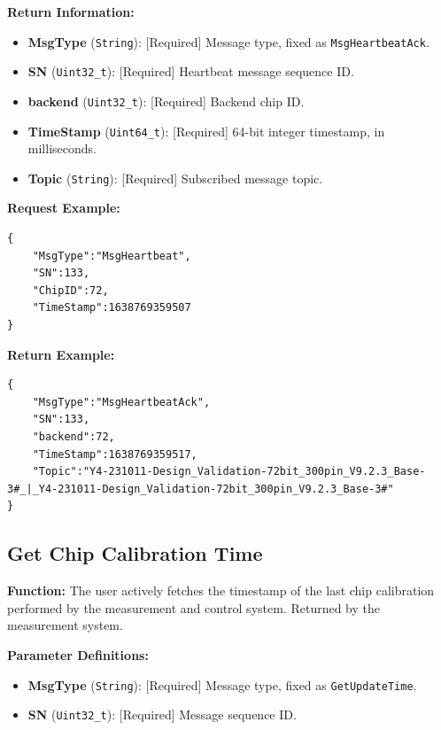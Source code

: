 \documentclass[12pt, a4paper]{article}
\begin{document}
\textbf{Return Information:}
\begin{itemize}
    \item \textbf{MsgType} (\texttt{String}): [Required] Message type, fixed as \texttt{MsgHeartbeatAck}.
    \item \textbf{SN} (\texttt{Uint32\_t}): [Required] Heartbeat message sequence ID.
    \item \textbf{backend} (\texttt{Uint32\_t}): [Required] Backend chip ID.
    \item \textbf{TimeStamp} (\texttt{Uint64\_t}): [Required] 64-bit integer timestamp, in milliseconds.
    \item \textbf{Topic} (\texttt{String}): [Required] Subscribed message topic.
\end{itemize}

\noindent \textbf{Request Example:}
\begin{lstlisting}
{
    "MsgType":"MsgHeartbeat",
    "SN":133,
    "ChipID":72,
    "TimeStamp":1638769359507
}
\end{lstlisting}

\noindent \textbf{Return Example:}
\begin{lstlisting}
{
    "MsgType":"MsgHeartbeatAck",
    "SN":133,
    "backend":72,
    "TimeStamp":1638769359517,
    "Topic":"Y4-231011-Design_Validation-72bit_300pin_V9.2.3_Base-3#_|_Y4-231011-Design_Validation-72bit_300pin_V9.2.3_Base-3#"
}
\end{lstlisting}

\subsection{Get Chip Calibration Time}

\textbf{Function:} The user actively fetches the timestamp of the last chip calibration performed by the measurement and control system. Returned by the measurement system.

\textbf{Parameter Definitions:}
\begin{itemize}
    \item \textbf{MsgType} (\texttt{String}): [Required] Message type, fixed as \texttt{GetUpdateTime}.
    \item \textbf{SN} (\texttt{Uint32\_t}): [Required] Message sequence ID.
\end{itemize}
\end{document}
